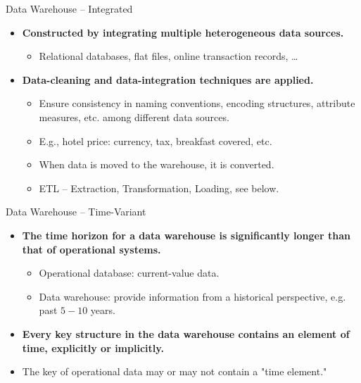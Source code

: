 \begin{frame}{Data Warehouse -- Integrated}
	\begin{itemize}
		\item \textbf{Constructed by {\color{airforceblue}integrating multiple heterogeneous data sources}.}
		      \begin{itemize}
			      \item Relational databases, flat files, online transaction records, \ldots
		      \end{itemize}
		\item \textbf{Data-cleaning and data-integration techniques are applied.}
		      \begin{itemize}
			      \item Ensure consistency in naming conventions, encoding structures, attribute measures, etc. among different data sources.
			      \item E.g., hotel price: currency, tax, breakfast covered, etc.
			      \item When data is moved to the warehouse, it is converted.
			      \item ETL -- Extraction, Transformation, Loading, see below.
		      \end{itemize}
	\end{itemize}
\end{frame}

\begin{frame}{Data Warehouse -- Time-Variant}
	\begin{itemize}
		\item \textbf{The {\color{airforceblue}time horizon} for a data warehouse is
				      {\color{airforceblue}significantly longer} than that of operational
			      systems.}
		      \begin{itemize}
			      \item Operational database: current-value data.
			      \item Data warehouse: provide information from a historical perspective, e.g. past $5-10$ years.
		      \end{itemize}
		\item \textbf{Every key structure in the data warehouse contains an
			      element of time, explicitly or implicitly.}
		\item The key of operational data may or may not contain a "time element."
	\end{itemize}
\end{frame}

